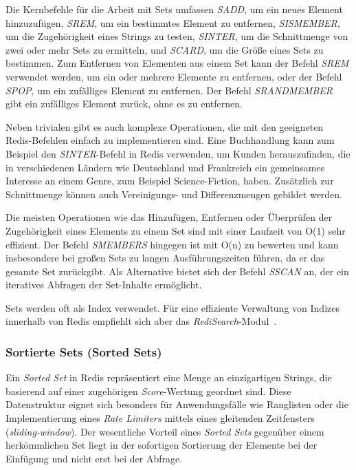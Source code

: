 Die Kernbefehle für die Arbeit mit Sets umfassen \emph{SADD}, um ein neues Element hinzuzufügen, \emph{SREM}, um ein bestimmtes Element zu entfernen, \emph{SISMEMBER}, um die Zugehörigkeit eines Strings zu testen, \emph{SINTER}, um die Schnittmenge von zwei oder mehr Sets zu ermitteln, und \emph{SCARD}, um die Größe eines Sets zu bestimmen.
Zum Entfernen von Elementen aus einem Set kann der Befehl \emph{SREM} verwendet werden, um ein oder mehrere Elemente zu entfernen, oder der Befehl \emph{SPOP}, um ein zufälliges Element zu entfernen.
Der Befehl \emph{SRANDMEMBER} gibt ein zufälliges Element zurück, ohne es zu entfernen.

Neben trivialen gibt es auch komplexe Operationen, die mit den geeigneten Redis-Befehlen einfach zu implementieren sind.
Eine Buchhandlung kann zum Beispiel den \emph{SINTER}-Befehl in Redis verwenden, um Kunden herauszufinden, die in verschiedenen Ländern wie Deutschland und Frankreich ein gemeinsames Interesse an einem Genre, zum Beispiel Science-Fiction, haben.
Zusätzlich zur Schnittmenge können auch Vereinigungs- und Differenzmengen gebildet werden.

Die meisten Operationen wie das Hinzufügen, Entfernen oder Überprüfen der Zugehörigkeit eines Elements zu einem Set sind mit einer Laufzeit von O(1) sehr effizient.
Der Befehl \emph{SMEMBERS} hingegen ist mit O(n) zu bewerten und kann insbesondere bei großen Sets zu langen Ausführungszeiten führen, da er das gesamte Set zurückgibt.
Als Alternative bietet sich der Befehl \emph{SSCAN} an, der ein iteratives Abfragen der Set-Inhalte ermöglicht.

Sets werden oft als Index verwendet. Für eine effiziente Verwaltung von Indizes innerhalb von Redis empfiehlt sich aber das \emph{RediSearch}-Modul~\cite{redis_ltd_sets_nodate}.


\subsubsection{Sortierte Sets (Sorted Sets)}
Ein \emph{Sorted Set} in Redis repräsentiert eine Menge an einzigartigen Strings, die basierend auf einer zugehörigen \emph{Score}-Wertung geordnet sind. Diese Datenstruktur eignet sich besonders für Anwendungsfälle wie Ranglisten oder die Implementierung eines \emph{Rate Limiters} mittels eines gleitenden Zeitfensters (\emph{sliding-window}). Der wesentliche Vorteil eines \emph{Sorted Sets} gegenüber einem herkömmlichen Set liegt in der sofortigen Sortierung der Elemente bei der Einfügung und nicht erst bei der Abfrage. %

